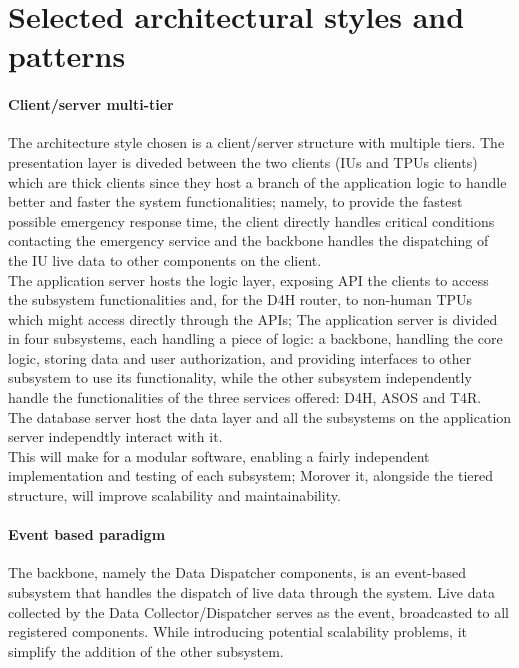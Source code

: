 \section{Selected architectural styles and patterns}
\paragraph{Client/server multi-tier}
The architecture style chosen is a client/server structure with multiple tiers. The presentation layer is diveded between the two clients (IUs and TPUs clients) which are thick clients since they host a branch of the application logic to handle better and faster the system functionalities; namely, to provide the fastest possible emergency response time, the client directly handles critical conditions contacting the emergency service and the backbone handles the dispatching of the IU live data to other components on the client. \\
The application server hosts the logic layer, exposing API the clients to access the subsystem functionalities and, for the D4H router, to non-human TPUs which might access directly through the APIs; The application server is divided in four subsystems, each handling a piece of logic: a backbone, handling the core logic, storing data and user authorization, and providing interfaces to other subsystem to use its functionality, while the other subsystem independently handle the functionalities of the three services offered: D4H, ASOS and T4R. \\
The database server host the data layer and all the subsystems on the application server independtly interact with it.
\\
This will make for a modular software, enabling a fairly independent implementation and testing of each subsystem; Morover it, alongside the tiered structure, will improve scalability and maintainability.

\paragraph{Event based paradigm}
The backbone, namely the Data Dispatcher components, is an event-based subsystem that handles the dispatch of live data through the system. Live data collected by the Data Collector/Dispatcher serves as the event, broadcasted to all registered components. While introducing potential scalability problems, it simplify the addition of the other subsystem.